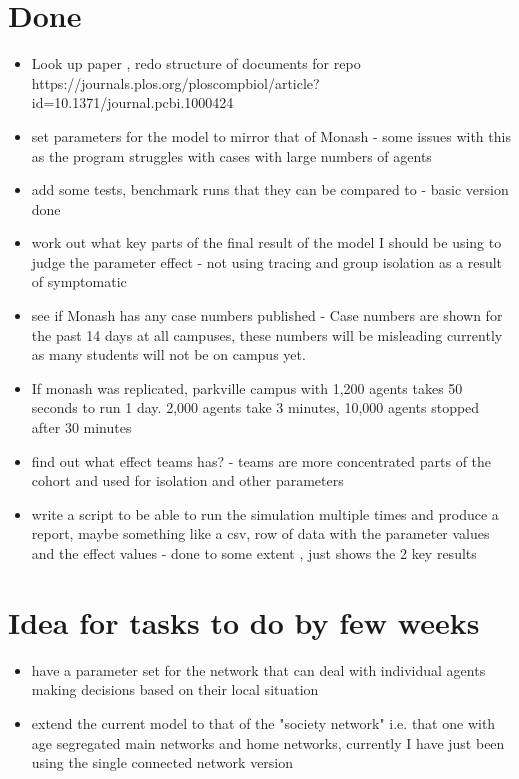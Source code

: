 \documentclass{article}
\begin{document}
\section{Done}
\begin{itemize}
\item Look up paper , redo structure of documents for repo https://journals.plos.org/ploscompbiol/article?id=10.1371/journal.pcbi.1000424

\item set parameters for the model to mirror that of Monash - some issues with this as the program struggles with cases with large numbers of agents

\item add some tests, benchmark runs that they can be compared to - basic version done

\item work out what key parts of the final result of the model I should be using to judge the parameter effect - not using tracing and group isolation as a result of symptomatic

\item see if Monash has any case numbers published - Case numbers are shown for the past 14 days at all campuses, these numbers will be misleading currently as many students will not be on campus yet.  
\item If monash was replicated, parkville campus with 1,200 agents takes 50 seconds to run 1 day. 2,000 agents take 3 minutes, 10,000 agents stopped after 30 minutes

\item find out what effect teams has? - teams are more concentrated parts of the cohort and used for isolation and other parameters

\item write a script to be able to run the simulation multiple times and produce a report, maybe something like a csv, row of data with the parameter values and the effect values - done to some extent , just shows the 2 key results

\end{itemize}
\section{Idea for tasks to do by few weeks}
\begin{itemize}
\item have a parameter set for the network that can deal with individual agents making decisions based on their local situation
\item extend the current model to that of the "society network" i.e. that one with age segregated main networks and home networks, currently I have just been using the single connected network version 
\end{itemize}
\end{document}
